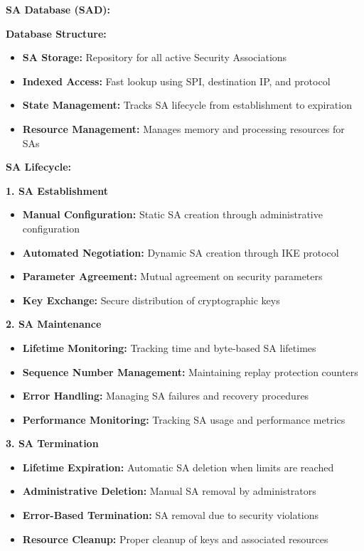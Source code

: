 \documentclass[12pt,a4paper]{article}
\begin{document}
\textbf{SA Database (SAD):}

\textbf{Database Structure:}
\begin{itemize}
    \item \textbf{SA Storage:} Repository for all active Security Associations
    \item \textbf{Indexed Access:} Fast lookup using SPI, destination IP, and protocol
    \item \textbf{State Management:} Tracks SA lifecycle from establishment to expiration
    \item \textbf{Resource Management:} Manages memory and processing resources for SAs
\end{itemize}

\textbf{SA Lifecycle:}

\textbf{1. SA Establishment}
\begin{itemize}
    \item \textbf{Manual Configuration:} Static SA creation through administrative configuration
    \item \textbf{Automated Negotiation:} Dynamic SA creation through IKE protocol
    \item \textbf{Parameter Agreement:} Mutual agreement on security parameters
    \item \textbf{Key Exchange:} Secure distribution of cryptographic keys
\end{itemize}

\textbf{2. SA Maintenance}
\begin{itemize}
    \item \textbf{Lifetime Monitoring:} Tracking time and byte-based SA lifetimes
    \item \textbf{Sequence Number Management:} Maintaining replay protection counters
    \item \textbf{Error Handling:} Managing SA failures and recovery procedures
    \item \textbf{Performance Monitoring:} Tracking SA usage and performance metrics
\end{itemize}

\textbf{3. SA Termination}
\begin{itemize}
    \item \textbf{Lifetime Expiration:} Automatic SA deletion when limits are reached
    \item \textbf{Administrative Deletion:} Manual SA removal by administrators
    \item \textbf{Error-Based Termination:} SA removal due to security violations
    \item \textbf{Resource Cleanup:} Proper cleanup of keys and associated resources
\end{itemize}
\end{document}
